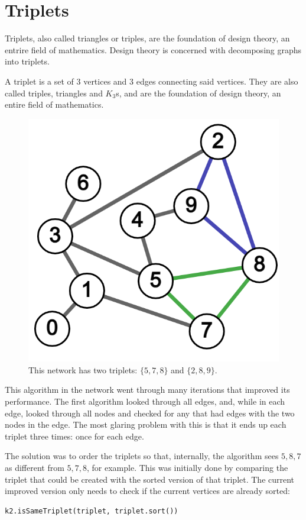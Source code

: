 \section{Triplets}

Triplets, also called triangles or triples, are the foundation
of design theory, an entrire field of mathematics.
Design theory is concerned with decomposing graphs into triplets.

A triplet is a set of 3 vertices and 3 edges connecting said vertices.
They are also called triples, triangles and $K_3$s, and are the foundation of design theory,
an entire field of mathematics.
\begin{figure}[H]
  \includegraphics[scale=.25]{img/triplets.png}
  \caption{This network has two triplets: $\{5,7,8\}$ and $\{2,8,9\}$.}
  \label{fig:core_ex}
\end{figure}
This algorithm in the network went through many iterations that improved its performance.
The first algorithm looked through all edges, and, while in each edge,
looked through all nodes and checked for any that had edges with the two nodes in the edge.
The most glaring problem with this is that it ends up each triplet three times:
once for each edge.

The solution was to order the triplets so that, internally, the algorithm
sees $5,8,7$ as different from $5,7,8$, for example.
This was initially done by comparing the triplet that could be created
with the sorted version of that triplet.
The current improved version only needs to check if the current vertices are already sorted:
\begin{verbatim}
k2.isSameTriplet(triplet, triplet.sort())
\end{verbatim}

